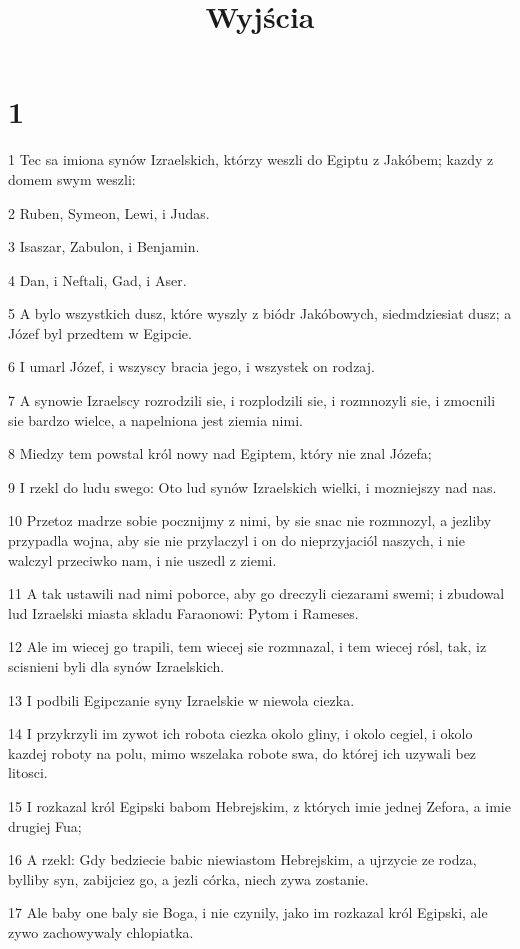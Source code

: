 

\title{Wyjścia}


\chapter{1}

\par 1 Tec sa imiona synów Izraelskich, którzy weszli do Egiptu z Jakóbem; kazdy z domem swym weszli:
\par 2 Ruben, Symeon, Lewi, i Judas.
\par 3 Isaszar, Zabulon, i Benjamin.
\par 4 Dan, i Neftali, Gad, i Aser.
\par 5 A bylo wszystkich dusz, które wyszly z biódr Jakóbowych, siedmdziesiat dusz; a Józef byl przedtem w Egipcie.
\par 6 I umarl Józef, i wszyscy bracia jego, i wszystek on rodzaj.
\par 7 A synowie Izraelscy rozrodzili sie, i rozplodzili sie, i rozmnozyli sie, i zmocnili sie bardzo wielce, a napelniona jest ziemia nimi.
\par 8 Miedzy tem powstal król nowy nad Egiptem, który nie znal Józefa;
\par 9 I rzekl do ludu swego: Oto lud synów Izraelskich wielki, i mozniejszy nad nas.
\par 10 Przetoz madrze sobie pocznijmy z nimi, by sie snac nie rozmnozyl, a jezliby przypadla wojna, aby sie nie przylaczyl i on do nieprzyjaciól naszych, i nie walczyl przeciwko nam, i nie uszedl z ziemi.
\par 11 A tak ustawili nad nimi poborce, aby go dreczyli ciezarami swemi; i zbudowal lud Izraelski miasta skladu Faraonowi: Pytom i Rameses.
\par 12 Ale im wiecej go trapili, tem wiecej sie rozmnazal, i tem wiecej rósl, tak, iz scisnieni byli dla synów Izraelskich.
\par 13 I podbili Egipczanie syny Izraelskie w niewola ciezka.
\par 14 I przykrzyli im zywot ich robota ciezka okolo gliny, i okolo cegiel, i okolo kazdej roboty na polu, mimo wszelaka robote swa, do której ich uzywali bez litosci.
\par 15 I rozkazal król Egipski babom Hebrejskim, z których imie jednej Zefora, a imie drugiej Fua;
\par 16 A rzekl: Gdy bedziecie babic niewiastom Hebrejskim, a ujrzycie ze rodza, bylliby syn, zabijciez go, a jezli córka, niech zywa zostanie.
\par 17 Ale baby one baly sie Boga, i nie czynily, jako im rozkazal król Egipski, ale zywo zachowywaly chlopiatka.
